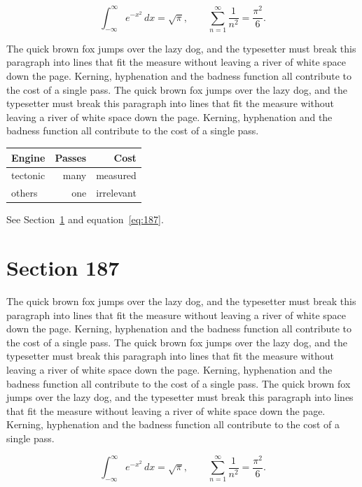 \documentclass{article}
\begin{document}
\begin{equation}\label{eq:186}
\int_{-\infty}^{\infty} e^{-x^{2}}\,dx = \sqrt{\pi}, \qquad
\sum_{n=1}^{\infty} \frac{1}{n^{2}} = \frac{\pi^{2}}{6}.
\end{equation}

The quick brown fox jumps over the lazy dog, and the typesetter must break this paragraph into lines that fit the measure without leaving a river of white space down the page. Kerning, hyphenation and the badness function all contribute to the cost of a single pass. The quick brown fox jumps over the lazy dog, and the typesetter must break this paragraph into lines that fit the measure without leaving a river of white space down the page. Kerning, hyphenation and the badness function all contribute to the cost of a single pass. 

\begin{center}
\begin{tabular}{lrr}
\toprule
Engine & Passes & Cost \\
\midrule
tectonic & many & measured \\
others & one & irrelevant \\
\bottomrule
\end{tabular}
\end{center}

See Section~\ref{sec:187} and equation~\eqref{eq:187}.
\section{Section 187}
\label{sec:187}
The quick brown fox jumps over the lazy dog, and the typesetter must break this paragraph into lines that fit the measure without leaving a river of white space down the page. Kerning, hyphenation and the badness function all contribute to the cost of a single pass. The quick brown fox jumps over the lazy dog, and the typesetter must break this paragraph into lines that fit the measure without leaving a river of white space down the page. Kerning, hyphenation and the badness function all contribute to the cost of a single pass. The quick brown fox jumps over the lazy dog, and the typesetter must break this paragraph into lines that fit the measure without leaving a river of white space down the page. Kerning, hyphenation and the badness function all contribute to the cost of a single pass. 

\begin{equation}\label{eq:187}
\int_{-\infty}^{\infty} e^{-x^{2}}\,dx = \sqrt{\pi}, \qquad
\sum_{n=1}^{\infty} \frac{1}{n^{2}} = \frac{\pi^{2}}{6}.
\end{equation}
\end{document}
